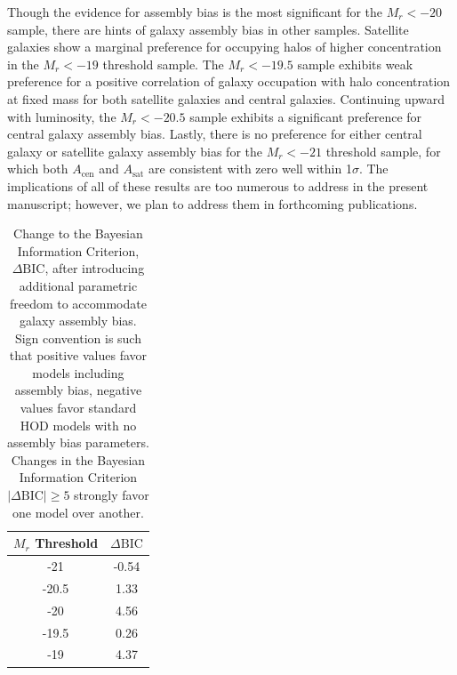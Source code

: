 \documentclass[usenatbib,usegraphicx,letterpaper]{mn2e}
\begin{document}
Though the evidence for assembly bias is the most significant for the $M_r<-20$ sample,
there are hints of galaxy assembly bias in other samples. Satellite galaxies show a marginal preference
for occupying halos of higher concentration in the $M_r < -19$ threshold sample. The $M_r < -19.5$
sample exhibits weak preference for a positive correlation of galaxy occupation with halo concentration at fixed
mass for both satellite galaxies and central galaxies. Continuing upward with luminosity,
the $M_r < -20.5$ sample exhibits a significant preference for central galaxy assembly bias.
Lastly, there is no preference for either central galaxy or satellite galaxy assembly bias
for the $M_r < -21$ threshold sample, for which both $A_{\mathrm{cen}}$ and $A_{\mathrm{sat}}$
are consistent with zero well within 1$\sigma$. The implications of all of these results are too numerous 
to address in the present manuscript; however, we plan to address them in forthcoming publications.

\begin{table}
\begin{center}
{\renewcommand{\arraystretch}{1.3}
\renewcommand{\tabcolsep}{0.2cm}
\begin{tabular}{c c}
\hline
\hline
$M_r$ Threshold & $\Delta \mathrm{BIC}$ \\
\hline
-21 & -0.54 \\
-20.5 & 1.33 \\
-20 & 4.56\\
-19.5 & 0.26\\
-19 & 4.37\\
\hline
\end{tabular}
\medskip
\caption{
Change to the Bayesian Information Criterion, $\Delta \mathrm{BIC}$,
after introducing additional parametric freedom to accommodate galaxy
assembly bias. Sign convention is such that positive values favor models including
assembly bias, negative values favor standard HOD models with no assembly bias parameters. Changes in
the Bayesian Information Criterion $\vert \Delta \mathrm{BIC}\vert \ge 5$ strongly favor one model
over another.
}
 }
 \label{table:bic}
 \end{center}
\end{table}
\end{document}
